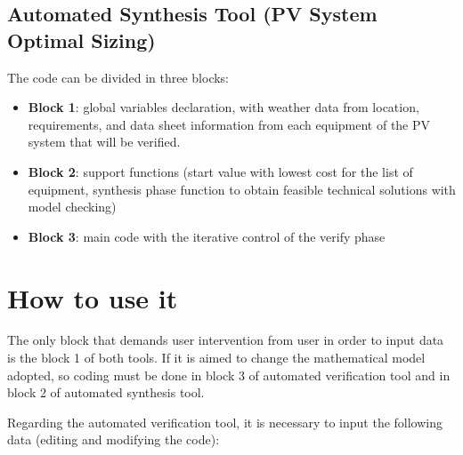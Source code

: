 \subsection{Automated Synthesis Tool (PV System Optimal Sizing)}
\label{sec:automatedsynthesis}

The code can be divided in three blocks:

\begin{itemize}
\item \textbf{Block 1}: global variables declaration, with weather data from location, requirements, and data sheet information from each equipment of the PV system that will be verified. 

\item \textbf{Block 2}: support functions (start value with lowest cost for the list of equipment, synthesis phase function to obtain feasible technical solutions with model checking)

\item \textbf{Block 3}: main code with the iterative control of the verify phase
\end{itemize}


\section{How to use it}

The only block that demands user intervention from user in order to input data is the block 1 of both tools. If it is aimed to change the mathematical model adopted, so coding must be done in block 3 of automated verification tool and in block 2 of automated synthesis tool.

Regarding the automated verification tool, it is necessary to input the following data (editing and modifying the code):

